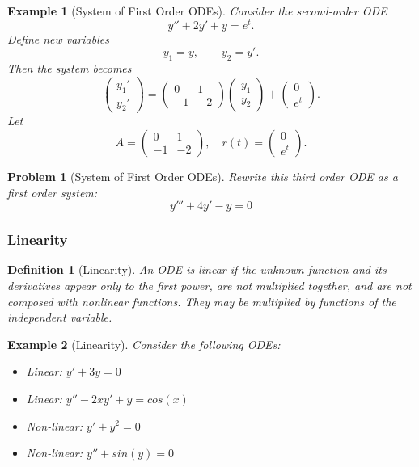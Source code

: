 \documentclass{article}
\newtheorem{definition}{Definition}
\newtheorem{problem}{Problem}
\newtheorem*{example}{Example}
\begin{document}
\begin{example}[System of First Order ODEs]
    Consider the second-order ODE
    \[y'' + 2y' + y = e^t.\]
    Define new variables
    \[y_1 = y, \qquad y_2 = y'.\]
    Then the system becomes
    \[\begin{pmatrix}y_1' \\ y_2'\end{pmatrix} = \begin{pmatrix}0 & 1 \\ -1 & -2\end{pmatrix} \begin{pmatrix}y_1 \\ y_2\end{pmatrix} + \begin{pmatrix} 0 \\ e^t \end{pmatrix}.\]
    Let
    \[A = \begin{pmatrix} 0 & 1 \\ -1 & -2 \end{pmatrix},\quad r(t) = \begin{pmatrix} 0 \\ e^t \end{pmatrix}.\]
\end{example}
\begin{problem}[System of First Order ODEs]
    Rewrite this third order ODE as a first order system:
    \[y''' + 4y' - y = 0\]
\end{problem}

\subsubsection{Linearity}
\begin{definition}[Linearity]
    An ODE is linear if the unknown function and its derivatives appear only to the first power, are not multiplied together, and are not composed with nonlinear functions. They may be multiplied by functions of the independent variable.
\end{definition}
\begin{example}[Linearity]
    Consider the following ODEs:
    \begin{itemize}
        \item Linear: $y' +3y = 0$
        \item Linear: $y'' - 2xy' + y = cos(x)$
        \item Non-linear: $y' + y^2 = 0$
        \item Non-linear: $y'' + sin(y) = 0$
    \end{itemize}
\end{example}
\end{document}
